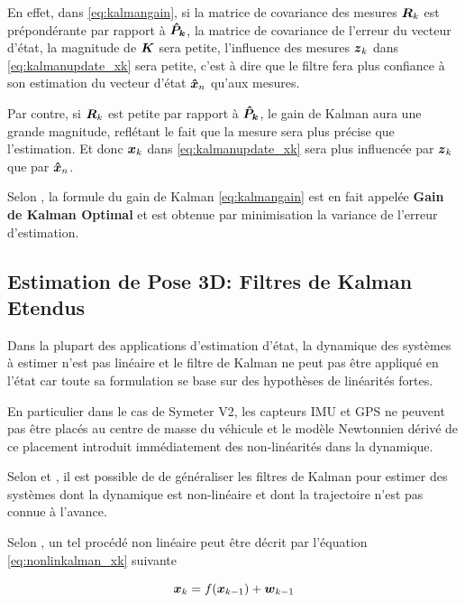 \documentclass[12pt,a4paper]{report}
\begin{document}
	\para En effet, dans \ref{eq:kalmangain}, si la matrice de covariance des mesures $\boldsymbol{R}_k$ est prépondérante par rapport à $\boldsymbol{\hat{P}_k}$, la matrice de covariance de l'erreur du vecteur d'état, la magnitude de $\boldsymbol{K}$ sera petite, l'influence des mesures $\boldsymbol{z}_k$ dans \ref{eq:kalmanupdate_xk} sera petite, c'est à dire que le filtre fera plus confiance à son estimation du vecteur d'état $\boldsymbol{\hat{x}}_n$ qu'aux mesures.
	
	\para Par contre, si $\boldsymbol{R}_k$ est petite par rapport à $\boldsymbol{\hat{P}_k}$, le gain de Kalman aura une grande magnitude, reflétant le fait que la mesure sera plus précise que l'estimation. Et donc $\boldsymbol{x}_k$ dans \ref{eq:kalmanupdate_xk} sera plus influencée par $\boldsymbol{z}_k$ que par $\boldsymbol{\hat{x}}_n$.
	
	\para Selon \cite{zarchan_fundamentals_2009}, la formule du gain de Kalman \ref{eq:kalmangain} est en fait appelée \textbf{Gain de Kalman Optimal} et est obtenue par minimisation la variance de l'erreur d'estimation.
	
	
	\subsection{Estimation de Pose 3D: Filtres de Kalman Etendus}
	
	Dans la plupart des applications d'estimation d'état, la dynamique des systèmes à estimer n'est pas linéaire et le filtre de Kalman ne peut pas être appliqué en l'état car toute sa formulation se base sur des hypothèses de linéarités fortes.
	
	\para En particulier dans le cas de Symeter V2, les capteurs IMU et GPS ne peuvent pas être placés au centre de masse du véhicule et le modèle Newtonnien dérivé de ce placement introduit immédiatement des non-linéarités dans la dynamique.
	
	\para Selon \cite{menegatti_generalized_2016} et \cite{zarchan_fundamentals_2009}, il est possible de de généraliser les filtres de Kalman pour estimer des systèmes dont la dynamique est non-linéaire et dont la trajectoire n'est pas connue à l'avance.
	
	\para Selon \cite{menegatti_generalized_2016}, un tel procédé non linéaire peut être décrit par l'équation \ref{eq:nonlinkalman_xk} suivante
	
	\begin{equation}
	\label{eq:nonlinkalman_xk}
	\boldsymbol{x}_k = f(\boldsymbol{x}_{k-1}) + \boldsymbol{w}_{k-1}
	\end{equation}
	
\end{document}
